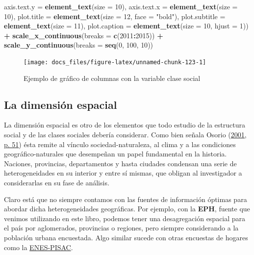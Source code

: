 \documentclass[
]{article}
\newenvironment{Shaded}{\begin{snugshade}}{\end{snugshade}}
\newcommand{\AttributeTok}[1]{\textcolor[rgb]{0.13,0.29,0.53}{#1}}
\newcommand{\DecValTok}[1]{\textcolor[rgb]{0.00,0.00,0.81}{#1}}
\newcommand{\FunctionTok}[1]{\textcolor[rgb]{0.13,0.29,0.53}{\textbf{#1}}}
\newcommand{\NormalTok}[1]{#1}
\newcommand{\SpecialCharTok}[1]{\textcolor[rgb]{0.81,0.36,0.00}{\textbf{#1}}}
\newcommand{\StringTok}[1]{\textcolor[rgb]{0.31,0.60,0.02}{#1}}
\begin{document}
\begin{Shaded}
\begin{Highlighting}[]
    \AttributeTok{axis.text.y =} \FunctionTok{element\_text}\NormalTok{(}\AttributeTok{size =} \DecValTok{10}\NormalTok{), }\AttributeTok{axis.text.x =} \FunctionTok{element\_text}\NormalTok{(}\AttributeTok{size =} \DecValTok{10}\NormalTok{),}
    \AttributeTok{plot.title =} \FunctionTok{element\_text}\NormalTok{(}\AttributeTok{size =} \DecValTok{12}\NormalTok{, }\AttributeTok{face =} \StringTok{"bold"}\NormalTok{), }\AttributeTok{plot.subtitle =} \FunctionTok{element\_text}\NormalTok{(}\AttributeTok{size =} \DecValTok{11}\NormalTok{),}
    \AttributeTok{plot.caption =} \FunctionTok{element\_text}\NormalTok{(}\AttributeTok{size =} \DecValTok{10}\NormalTok{, }\AttributeTok{hjust =} \DecValTok{1}\NormalTok{)) }\SpecialCharTok{+} \FunctionTok{scale\_x\_continuous}\NormalTok{(}\AttributeTok{breaks =} \FunctionTok{c}\NormalTok{(}\DecValTok{2011}\SpecialCharTok{:}\DecValTok{2015}\NormalTok{)) }\SpecialCharTok{+}
    \FunctionTok{scale\_y\_continuous}\NormalTok{(}\AttributeTok{breaks =} \FunctionTok{seq}\NormalTok{(}\DecValTok{0}\NormalTok{, }\DecValTok{100}\NormalTok{, }\DecValTok{10}\NormalTok{))}
\end{Highlighting}
\end{Shaded}

\begin{figure}

{\centering \texttt{[image: docs\_files/figure-latex/unnamed-chunk-123-1]} 

}

\caption{Ejemplo de gráfico de columnas con la variable clase social}\label{fig:unnamed-chunk-123}
\end{figure}

\hypertarget{espacial}{%
\subsection{La dimensión espacial}\label{espacial}}

La dimensión espacial es otro de los elementos que todo estudio de la estructura social y de las clases sociales debería considerar. Como bien señala Osorio (\protect\hyperlink{ref-Osorio2001}{2001, p. 51}) ésta remite al vínculo sociedad-naturaleza, al clima y a las condiciones geográfico-naturales que desempeñan un papel fundamental en la historia. Naciones, provincias, departamentos y hasta ciudades condensan una serie de heterogeneidades en su interior y entre sí mismas, que obligan al investigador a considerarlas en su fase de análisis.

Claro está que no siempre contamos con las fuentes de información óptimas para abordar dicha heterogeneidades geográficas. Por ejemplo, con la \textbf{EPH}, fuente que venimos utilizando en este libro, podemos tener una desagregación espacial para el país por aglomerados, provincias o regiones, pero siempre considerando a la población urbana encuestada. Algo similar sucede con otras encuestas de hogares como la \href{https://www.argentina.gob.ar/ciencia/pisac/bases-de-datos}{ENES-PISAC}.
\end{document}
